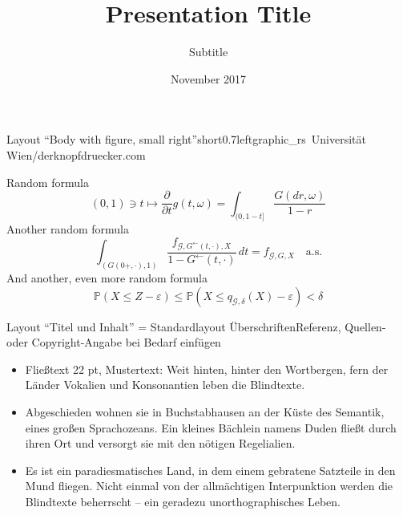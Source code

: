 \documentclass[hyperref={pdfpagelabels=false}, aspectratio=169, t]{beamer}  %
\title{Presentation Title}											%
\subtitle{Subtitle}                   					%
\date{November 2017}              									%
\begin{document}

\maketitle
											
													




\begin{graphicsFrame}{Layout ``Body with figure, small right''}{short}{0.7}{left}{graphic_rs}{\textcopyright~Universität Wien/derknopfdruecker.com}

		Random formula
		\[
			(0,1)\ni t\mapsto\frac{\partial}{\partial t} g(t,\omega)=\int_{( 0,1-t]}\frac{G(dr,\omega)}{1-r}
		\]
		Another random formula
		\begin{equation}\label{eq1}
			\int_{( G(0+,\cdot),1)}\frac{ f_{\mathcal{G},G^{\leftarrow}(t,\cdot),X}}{1-G^{\leftarrow}(t,\cdot)}\,dt
			= f_{\mathcal{G},G,X}\quad \textrm{a.s.}
		\end{equation}
		And another, even more random formula
		\[
			\mathbb{P}(X\leq Z-\varepsilon)\leq
			\mathbb{P}(X\leq q_{\mathcal{G},\delta}(X)-\varepsilon )< \delta
		\]

\end{graphicsFrame}									

\begin{textFrame}{Layout ``Titel und Inhalt'' = Standardlayout Überschriften}{}{Referenz, Quellen- oder Copyright-Angabe bei Bedarf einfügen}

	\begin{itemize}
		\item Fließtext 22 pt, Mustertext: Weit hinten, hinter den Wortbergen, fern der Länder Vokalien und Konsonantien leben die Blindtexte.
		\item Abgeschieden wohnen sie in Buchstabhausen an der Küste des Semantik, eines großen Sprachozeans. Ein kleines Bächlein namens Duden fließt durch ihren Ort und versorgt sie mit den nötigen Regelialien.
		\item Es ist ein paradiesmatisches Land, in dem einem gebratene Satzteile in den Mund fliegen. Nicht einmal von der allmächtigen Interpunktion werden die Blindtexte beherrscht – ein geradezu unorthographisches Leben.

	\end{itemize}
\end{textFrame}
\end{document}

